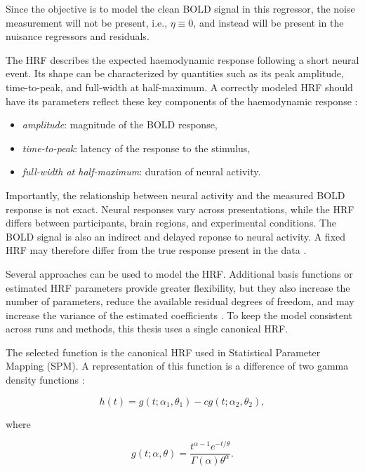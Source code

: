 \documentclass[english]{pwr_wmat_praca_dyplomowa}
\theoremstyle{definition}
\theoremstyle{remark}
\begin{document}
Since the objective is to model the clean BOLD signal in this regressor, the noise measurement will not be present, i.e., $\eta \equiv 0$, and instead will be present in the nuisance regressors and residuals.

The HRF describes the expected haemodynamic response following a short neural event. Its shape can be characterized by quantities such as its peak amplitude, time-to-peak, and full-width at half-maximum. A correctly modeled HRF should have its parameters reflect these key components of the haemodynamic response \cite{hrf-problems}:
\begin{itemize}
    \item \textit{amplitude}: magnitude of the BOLD response,
    \item \textit{time-to-peak}: latency of the response to the stimulus,
    \item \textit{full-width at half-maximum}: duration of neural activity.
\end{itemize}

Importantly, the relationship between neural activity and the measured BOLD response is not exact. Neural responses vary across presentations, while the HRF differs between participants, brain regions, and experimental conditions. The BOLD signal is also an indirect and delayed reponse to neural activity. A fixed HRF may therefore differ from the true response present in the data \cite{hrf-problems}.

Several approaches can be used to model the HRF. Additional basis functions or estimated HRF parameters provide greater flexibility, but they also increase the number of parameters, reduce the available residual degrees of freedom, and may increase the variance of the estimated coefficients \cite{hrf-problems}. To keep the model consistent across runs and methods, this thesis uses a single canonical HRF.

The selected function is the canonical HRF used in Statistical Parameter Mapping (SPM). A representation of this function is a difference of two gamma density functions \cite[Equation A1]{hrf-problems}:

\begin{equation}
    h(t) = g(t;\alpha_1,\theta_1) - cg(t;\alpha_2,\theta_2),
\end{equation}

where

\begin{equation}
    g(t;\alpha,\theta) = \frac{t^{\alpha-1}e^{-t/\theta}}{\Gamma(\alpha)\theta^\alpha}.
\end{equation}
\end{document}
